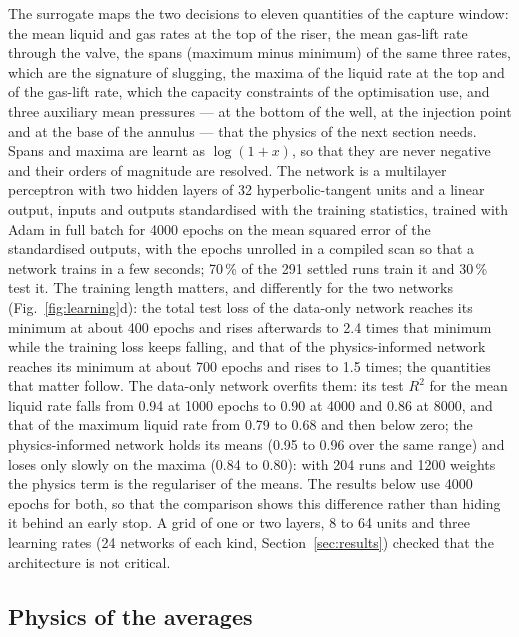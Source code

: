 \documentclass[a4paper,fleqn]{cas-sc}
\begin{document}
The surrogate maps the two decisions to eleven quantities of the capture window: the mean liquid and gas rates at the top of the riser, the mean gas-lift rate through the valve, the spans (maximum minus minimum) of the same three rates, which are the signature of slugging, the maxima of the liquid rate at the top and of the gas-lift rate, which the capacity constraints of the optimisation use, and three auxiliary mean pressures --- at the bottom of the well, at the injection point and at the base of the annulus --- that the physics of the next section needs. Spans and maxima are learnt as $\log(1 + x)$, so that they are never negative and their orders of magnitude are resolved. The network is a multilayer perceptron \citep{hornik1989} with two hidden layers of 32 hyperbolic-tangent units and a linear output, inputs and outputs standardised with the training statistics, trained with Adam \citep{kingma2015} in full batch for 4000 epochs on the mean squared error of the standardised outputs, with the epochs unrolled in a compiled scan so that a network trains in a few seconds; 70\,\% of the 291 settled runs train it and 30\,\% test it. The training length matters, and differently for the two networks (Fig.~\ref{fig:learning}d): the total test loss of the data-only network reaches its minimum at about 400 epochs and rises afterwards to 2.4 times that minimum while the training loss keeps falling, and that of the physics-informed network reaches its minimum at about 700 epochs and rises to 1.5 times; the quantities that matter follow. The data-only network overfits them: its test $R^2$ for the mean liquid rate falls from 0.94 at 1000 epochs to 0.90 at 4000 and 0.86 at 8000, and that of the maximum liquid rate from 0.79 to 0.68 and then below zero; the physics-informed network holds its means (0.95 to 0.96 over the same range) and loses only slowly on the maxima (0.84 to 0.80): with 204 runs and 1200 weights the physics term is the regulariser of the means. The results below use 4000 epochs for both, so that the comparison shows this difference rather than hiding it behind an early stop. A grid of one or two layers, 8 to 64 units and three learning rates (24 networks of each kind, Section~\ref{sec:results}) checked that the architecture is not critical.

\subsection{Physics of the averages}\label{sec:physics}
\end{document}
